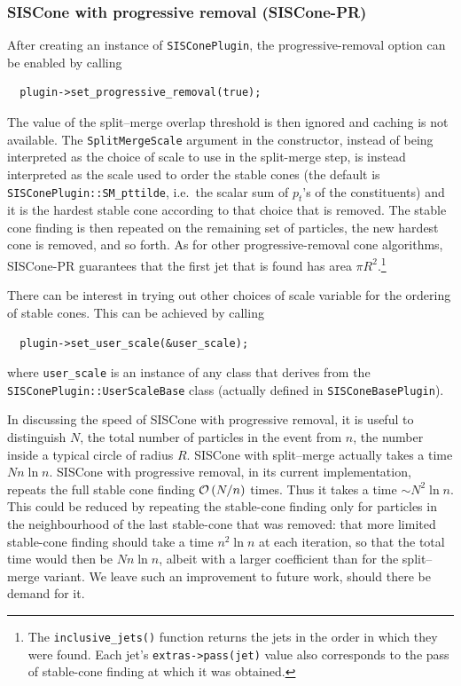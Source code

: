 \documentclass[12pt,a4]{article}
\newcommand{\ttt}[1]{{\small\texttt{#1}}}
\newcommand{\order}[1]{{\cal O}\left(#1\right)}
\begin{document}
\subsubsection{SISCone with progressive removal (SISCone-PR)}
\label{sec:SISCone-PR}

After creating an instance of \ttt{SISConePlugin}, the
progressive-removal option can be enabled by calling
\begin{lstlisting}
  plugin->set_progressive_removal(true);
\end{lstlisting}
The value of the split--merge overlap threshold is then ignored and
caching is not available.
%
The \ttt{SplitMergeScale} argument in the constructor, instead of
being interpreted as the choice of scale to use in the split-merge step,
is instead interpreted as the scale used to order the stable cones (the
default is \ttt{SISConePlugin::SM\_pttilde}, i.e.\ the scalar sum of
$p_t$'s of the constituents) and it is the hardest stable cone
according to that choice that is removed.
%
The stable cone finding is then repeated on the remaining set of
particles, the new hardest cone is removed, and so forth.
%
As for other progressive-removal cone algorithms, SISCone-PR
guarantees that the first jet that is found has area $\pi
R^2$.\footnote{The \texttt{inclusive\_jets()} function returns the
  jets in the order in which they were found. Each jet's
  \texttt{extras->pass(jet)} value also corresponds to the pass of
  stable-cone finding at which it was obtained.}

There can be interest in trying out other choices of scale variable for
the ordering of stable cones.
%
This can be achieved by calling
\begin{lstlisting}
  plugin->set_user_scale(&user_scale);
\end{lstlisting}
where \ttt{user\_scale} is an instance of any class that derives from
the \ttt{SISConePlugin::UserScaleBase} class (actually defined in
\ttt{SISConeBasePlugin}).

In discussing the speed of SISCone with progressive removal, it is
useful to distinguish $N$, the total number of particles in the event
from $n$, the number inside a typical circle of radius $R$.
%
SISCone with split--merge actually takes a time $N n \ln n$.
%
SISCone with progressive removal, in its current implementation,
repeats the full stable cone finding $\order{N/n}$ times.
%
Thus it takes a time $\sim N^2 \ln n$.
%
This could be reduced by repeating the stable-cone finding only for
particles in the neighbourhood of the last stable-cone that was
removed: that more limited stable-cone finding should take a time $n^2
\ln n$ at each iteration, so that the total time would then be $N n
\ln n$, albeit with a larger coefficient than for the split--merge
variant.
% 
We leave such an improvement to future work, should there be demand
for it.
\end{document}
